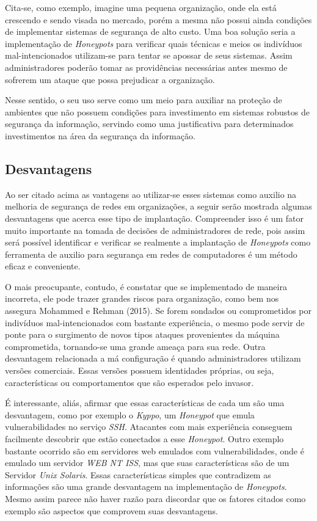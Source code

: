 Cita-se, como exemplo, imagine uma pequena organização, onde ela está crescendo e sendo visada no mercado, porém a mesma não possui ainda condições de implementar sistemas de segurança de alto custo. Uma boa solução seria a implementação de \textit{Honeypots} para verificar quais técnicas e meios os indivíduos mal-intencionados utilizam-se para tentar se apossar de seus sistemas. Assim administradores poderão tomar as providências necessárias antes mesmo de sofrerem um ataque que possa prejudicar a organização.

Nesse sentido, o seu uso serve como um meio para auxiliar na proteção de ambientes que não possuem condições para investimento em sistemas robustos de segurança da informação, servindo como uma justificativa para determinados investimentos na área da segurança da informação.

\subsection{Desvantagens}
Ao ser citado acima as vantagens ao utilizar-se esses sistemas como auxilio na melhoria de segurança de redes em organizações, a seguir serão mostrada algumas desvantagens que acerca esse tipo de implantação. Compreender isso é um fator muito importante na tomada de decisões de administradores de rede, pois assim será possível identificar e verificar se realmente a implantação de \textit{Honeypots} como ferramenta de auxilio para segurança em redes de computadores é um método eficaz e conveniente.

O mais preocupante, contudo, é constatar que se implementado de maneira incorreta, ele pode trazer grandes riscos para organização, como bem nos assegura Mohammed e Rehman (2015). Se forem sondados ou comprometidos por indivíduos mal-intencionados com bastante experiência, o mesmo pode servir de ponte para o surgimento de novos tipos ataques provenientes da máquina comprometida, tornando-se uma grande ameaça para sua rede. Outra desvantagem relacionada a má configuração é quando administradores utilizam versões comerciais. Essas versões possuem identidades próprias, ou seja, características ou comportamentos que são esperados pelo invasor.

É interessante, aliás, afirmar que essas características de cada um são uma desvantagem, como por exemplo o \textit{Kyppo}, um \textit{Honeypot} que emula vulnerabilidades no serviço \textit{SSH}. Atacantes com mais experiência conseguem facilmente descobrir que estão conectados a esse \textit{Honeypot}. Outro exemplo bastante ocorrido são em servidores web emulados com vulnerabilidades, onde é emulado um servidor \textit{WEB NT ISS}, mas que suas características são de um Servidor \textit{Unix Solaris}. Essas características simples que contradizem as informações são uma grande desvantagem na implementação de \textit{Honeypots}. Mesmo assim parece não haver razão para discordar que os fatores citados como exemplo são aspectos que comprovem suas desvantagens.

